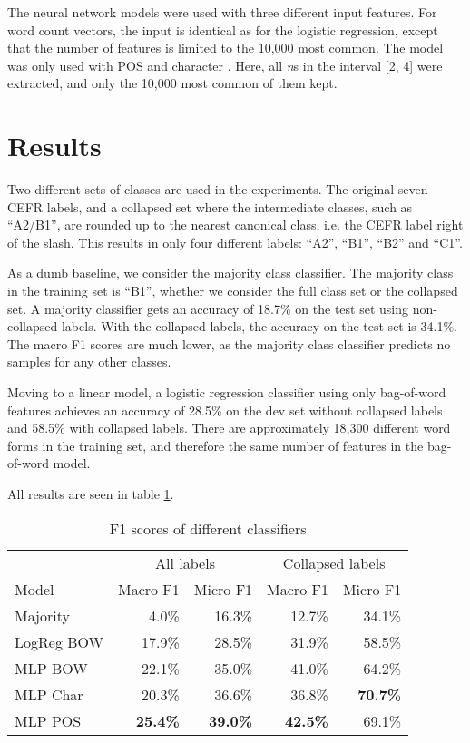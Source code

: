 The neural network models were used with three different input features. For
word count vectors, the input is identical as for the logistic regression,
except that the number of features is limited to the 10,000 most common. 
The model was only used with \ac{POS} and character \ngrams. Here, all 
\textit{n}s in the interval [2, 4] were extracted, and only the 10,000 most
common of them kept.

\section{Results}

Two different sets of classes are used in the experiments. The original seven
CEFR labels, and a collapsed set where the intermediate classes, such as
``A2/B1'', are rounded up to the nearest canonical class, i.e. the CEFR label
right of the slash. This results in only four different labels: ``A2'',
``B1'', ``B2'' and ``C1''.

As a dumb baseline, we consider the majority class classifier. The majority
class in the training set is ``B1'', whether we consider the full class set
or the collapsed set. A majority classifier gets an accuracy of 18.7\% on the
test set using non-collapsed labels. With the collapsed labels, the accuracy
on the test set is 34.1\%. The macro F1 scores are much lower, as the
majority class classifier predicts no samples for any other classes.

Moving to a linear model, a logistic regression classifier using only
bag-of-word features achieves an accuracy of 28.5\% on the dev set without
collapsed labels and 58.5\% with collapsed labels. There are approximately
18,300 different word forms in the training set, and therefore the same
number of features in the bag-of-word model.

All results are seen in table \ref{baseline-accuracies}.

\begin{table}
  \centering
  \begin{tabular}{|l|rr|rr|}
    \toprule
             & \multicolumn{2}{c|}{All labels} & \multicolumn{2}{c|}{Collapsed labels} \\
    Model      & Macro F1        & Micro F1        & Macro F1        & Micro F1       \\
    \midrule
    Majority   &          4.0\%  &         16.3\%  &         12.7\%  &         34.1\% \\
    LogReg BOW &         17.9\%  &         28.5\%  &         31.9\%  &         58.5\% \\
    MLP BOW    &         22.1\%  &         35.0\%  &         41.0\%  &         64.2\% \\
    MLP Char   &         20.3\%  &         36.6\%  &         36.8\%  & \textbf{70.7\%} \\
    MLP POS    & \textbf{25.4\%} & \textbf{39.0\%} & \textbf{42.5\%} &         69.1\% \\
    \bottomrule
  \end{tabular}
  \caption{F1 scores of different classifiers}
  \label{baseline-accuracies}
\end{table}

